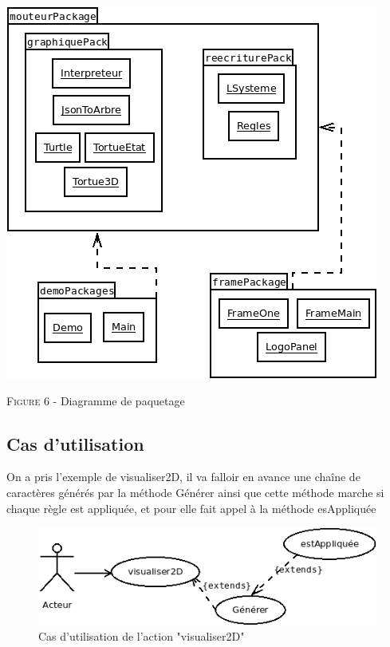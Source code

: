    
      \begin{center}
         \includegraphics[scale=\umlscale]{diagrammes/paquetage.png}
      \end{center}
      \begin{center}
          \large{\textsc{Figure 6 - }Diagramme de paquetage}
      \end{center}
        
        
   
  


\newpage
    \subsection{Cas d’utilisation}
    \begin{onehalfspace}
          \Large{On a pris l'exemple de visualiser2D, il va falloir en avance une chaîne de caractères générés par la méthode Générer ainsi que cette méthode marche si chaque règle est appliquée, et pour elle fait appel à la méthode esAppliquée}  
    \end{onehalfspace}

    
    \begin{figure}[!h]
      \begin{center}
         \includegraphics[scale=\umlscale]{diagrammes/usecase.png}
      \end{center}
        \caption{Cas d'utilisation de l'action "visualiser2D" }
        \label{fig:usecase}
    \end{figure}
    
